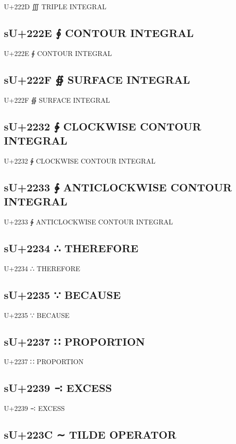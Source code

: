 U+222D ∭ TRIPLE INTEGRAL

\subsection{sU+222E ∮ CONTOUR INTEGRAL}

U+222E ∮ CONTOUR INTEGRAL

\subsection{sU+222F ∯ SURFACE INTEGRAL}

U+222F ∯ SURFACE INTEGRAL

\subsection{sU+2232 ∲ CLOCKWISE CONTOUR INTEGRAL}

U+2232 ∲ CLOCKWISE CONTOUR INTEGRAL

\subsection{sU+2233 ∳ ANTICLOCKWISE CONTOUR INTEGRAL}

U+2233 ∳ ANTICLOCKWISE CONTOUR INTEGRAL

\subsection{sU+2234 ∴ THEREFORE}

U+2234 ∴ THEREFORE

\subsection{sU+2235 ∵ BECAUSE}

U+2235 ∵ BECAUSE

\subsection{sU+2237 ∷ PROPORTION}

U+2237 ∷ PROPORTION

\subsection{sU+2239 ∹ EXCESS}

U+2239 ∹ EXCESS

\subsection{sU+223C ∼ TILDE OPERATOR}

